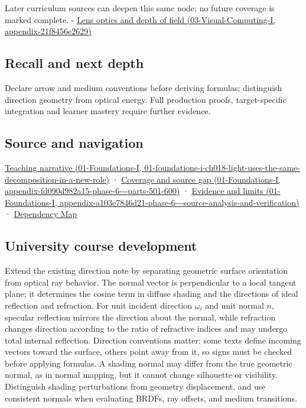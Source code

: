 Later curriculum sources can deepen this same node; no future coverage is marked complete. - \href{../03-Visual-Computing-I/main.pdf\#nameddest=appendix-21f8456e2629}{Lens optics and depth of field (03-Visual-Computing-I, appendix-21f8456e2629)}

\subsection{Recall and next depth}\label{appendix-44e00863b4d5-recall-and-next-depth}

Declare arrow and medium conventions before deriving formulas; distinguish direction geometry from optical energy. Full production proofs, target-specific integration and learner mastery require further evidence.

\subsection{Source and navigation}\label{appendix-44e00863b4d5-source-and-navigation}

\href{../01-Foundations-I/main.pdf\#nameddest=01-foundations-i-ch018-light-uses-the-same-decomposition-in-a-new-role}{Teaching narrative (01-Foundations-I, 01-foundations-i-ch018-light-uses-the-same-decomposition-in-a-new-role)} · \href{../01-Foundations-I/main.pdf\#nameddest=appendix-fd090d982a15-phase-6---parts-501-600}{Coverage and source gap (01-Foundations-I, appendix-fd090d982a15-phase-6-\/-\/-parts-501-600)} · \href{../01-Foundations-I/main.pdf\#nameddest=appendix-a103e7846d21-phase-6---source-analysis-and-verification}{Evidence and limits (01-Foundations-I, appendix-a103e7846d21-phase-6-\/-\/-source-analysis-and-verification)} · \hyperref[appendix-4ad47bdd269a]{Dependency Map}

\subsection{University course development}\label{appendix-44e00863b4d5-university-course-development}

Extend the existing direction note by separating geometric surface orientation from optical ray behavior. The normal vector is perpendicular to a local tangent plane; it determines the cosine term in diffuse shading and the directions of ideal reflection and refraction. For unit incident direction \(\omega_i\) and unit normal \(n\), specular reflection mirrors the direction about the normal, while refraction changes direction according to the ratio of refractive indices and may undergo total internal reflection. Direction conventions matter: some texts define incoming vectors toward the surface, others point away from it, so signs must be checked before applying formulas. A shading normal may differ from the true geometric normal, as in normal mapping, but it cannot change silhouette or visibility. Distinguish shading perturbations from geometry displacement, and use consistent normals when evaluating BRDFs, ray offsets, and medium transitions.

